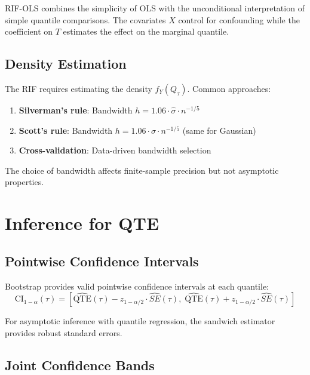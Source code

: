 \begin{insight}
RIF-OLS combines the simplicity of OLS with the unconditional interpretation of simple quantile comparisons. The covariates $X$ control for confounding while the coefficient on $T$ estimates the effect on the marginal quantile.
\end{insight}

\subsection{Density Estimation}

The RIF requires estimating the density $f_Y(Q_\tau)$. Common approaches:

\begin{enumerate}
    \item \textbf{Silverman's rule}: Bandwidth $h = 1.06 \cdot \hat{\sigma} \cdot n^{-1/5}$
    \item \textbf{Scott's rule}: Bandwidth $h = 1.06 \cdot \hat{\sigma} \cdot n^{-1/5}$ (same for Gaussian)
    \item \textbf{Cross-validation}: Data-driven bandwidth selection
\end{enumerate}

The choice of bandwidth affects finite-sample precision but not asymptotic properties.

\section{Inference for QTE}
\label{sec:qte-inference}

\subsection{Pointwise Confidence Intervals}

Bootstrap provides valid pointwise confidence intervals at each quantile:
\[
\text{CI}_{1-\alpha}(\tau) = \left[\widehat{\text{QTE}}(\tau) - z_{1-\alpha/2} \cdot \widehat{SE}(\tau), \; \widehat{\text{QTE}}(\tau) + z_{1-\alpha/2} \cdot \widehat{SE}(\tau)\right]
\]

For asymptotic inference with quantile regression, the sandwich estimator provides robust standard errors.

\subsection{Joint Confidence Bands}

